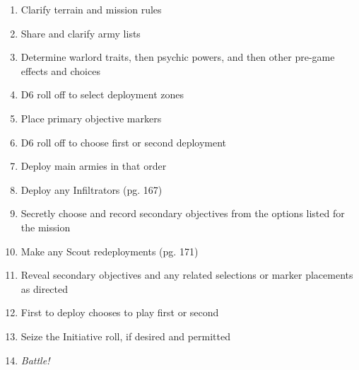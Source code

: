 \begin{enumerate}\shortlist
\item Clarify terrain and mission rules

\item Share and clarify army lists

\item Determine warlord traits, then psychic powers, and then other
  pre-game effects and choices

\item D6 roll off to select deployment zones

\item Place primary objective markers

\item D6 roll off to choose first or second deployment

\item Deploy main armies in that order

\item Deploy any Infiltrators (pg. 167)

\item Secretly choose and record secondary objectives from the options
  listed for the mission

\item Make any Scout redeployments (pg. 171)

\item Reveal secondary objectives and any related selections or marker
  placements as directed

\item First to deploy chooses to play first or second

\item Seize the Initiative roll, if desired and permitted

\item \emph{Battle!}
\end{enumerate}
